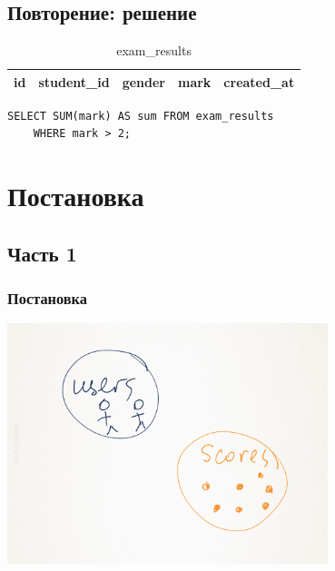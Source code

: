 \documentclass[compress,red]{beamer}
\begin{document}
\subsection{Повторение: решение}
\begin{frame}[fragile]
  \begin{table}
    \begin{tabular}{|c|c|c|c|c|}
      \hline
      id & student\_id & gender & mark & created\_at\\
      \hline
    \end{tabular}
    \caption{exam\_results}
  \end{table}
  
  \scriptsize{
  \begin{lstlisting}[label=sql2,caption=SUM]
    SELECT SUM(mark) AS sum FROM exam_results
    WHERE mark > 2;
  \end{lstlisting}
  }
\end{frame}

\section{Постановка}

\subsection{Часть 1}
\begin{frame}[fragile]
  \frametitle{Постановка}
  \centerline{\includegraphics[width=0.7\textwidth]{images/manual1.png}}
\end{frame}
\end{document}
